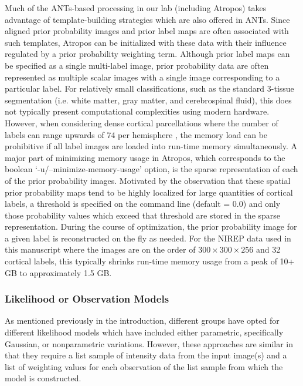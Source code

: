 \documentclass[11pt,english]{article}
\begin{document}
Much of the ANTs-based processing in our lab (including Atropos) takes advantage of template-building strategies 
\citep{Avants2010} which are also offered  in ANTs.  Since aligned prior probability images and prior label maps are often 
associated with such templates, Atropos can be initialized with these data with their influence regulated by a prior probability
weighting term.  Although prior label maps can be specified as a single multi-label image, prior probability data are often represented as
multiple scalar images with a single image corresponding to a particular label.  For relatively small classifications, such as 
the standard 3-tissue segmentation (i.e. white matter, gray matter, and cerebrospinal fluid), this does not typically present
computational complexities using modern hardware.  However, when considering dense cortical parcellations where the number
of labels can range upwards of 74 per hemisphere \citep{Destrieux2010}, the memory load can be prohibitive if all label images 
are loaded into run-time memory simultaneously.  A major part of minimizing memory usage in Atropos,  which corresponds to the boolean `{\ttfamily -u/--minimize-memory-usage}' option, is the sparse representation of each of the prior probability images.
Motivated by the observation that these spatial prior probability maps tend to be highly localized for large quantities of  
cortical labels, a threshold is specified on the command line (default = 0.0) and only those probability values which exceed 
that threshold are stored in the sparse representation.  During the course of optimization, the prior probability image for a
given label is reconstructed on the fly as needed.  For the NIREP data used in this manuscript where the images are 
on the order of $300 \times 300 \times 256$ and 32 cortical labels, this typically shrinks run-time memory usage from a 
peak of 10+ GB to approximately 1.5 GB. 
 
 \subsubsection{Likelihood or Observation Models}
As mentioned previously in the introduction, different groups have opted for different likelihood models which have included
either parametric, specifically Gaussian, or nonparametric variations.  However, these approaches are similar in that 
they require a list sample of intensity data from the input image(s) and a list of weighting values for each observation 
of the list sample from which the model is constructed.  
\end{document}
